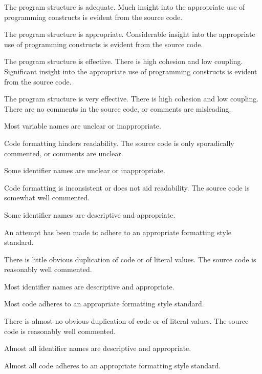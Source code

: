 \documentclass{../fal_assignment}
\begin{document}
\begin{markingrubric}
            \par The program structure is adequate.
        \grade Much insight into the appropriate use of programming constructs is evident from the source code.
            \par The program structure is appropriate.
        \grade Considerable insight into the appropriate use of programming constructs is evident from the source code.
            \par The program structure is effective. There is high cohesion and low coupling.
        \grade Significant insight into the appropriate use of programming constructs is evident from the source code.
            \par The program structure is very effective. There is high cohesion and low coupling.
%
        \grade\fail There are no comments in the source code, or comments are misleading.
            \par Most variable names are unclear or inappropriate.
            \par Code formatting hinders readability.
        \grade The source code is only sporadically commented, or comments are unclear.
            \par Some identifier names are unclear or inappropriate.
            \par Code formatting is inconsistent or does not aid readability.
        \grade The source code is somewhat well commented.
            \par Some identifier names are descriptive and appropriate.
            \par An attempt has been made to adhere to an appropriate formatting style standard.
             \par There is little obvious duplication of code or of literal values.           
        \grade The source code is reasonably well commented.
            \par Most identifier names are descriptive and appropriate.
            \par Most code adheres to an appropriate formatting style standard.
             \par There is almost no obvious duplication of code or of literal values.   
        \grade The source code is reasonably well commented.
            \par Almost all identifier names are descriptive and appropriate.
            \par Almost all code adheres to an appropriate formatting style standard.

\end{markingrubric}
\end{document}
